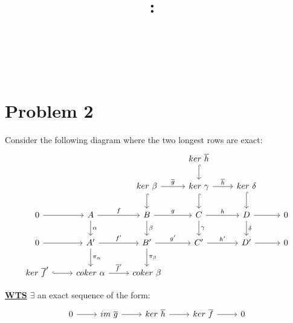 \documentclass{article}
\title{
    \vspace{2in}
    \textmd{\textbf{\hmwkClass:\ \hmwkTitle}}\\
    \vspace{0.1in}
    \textmd{\hmwkDueDate} \\
    \vspace{0.2in}\large{\textit{\hmwkClassInstructor\  }}
    \vspace{2in}
}
\author{\hmwkAuthorName}
\date{}
\begin{document}
\maketitle
\newpage

\section*{Problem 2}

Consider the following diagram where the two longest rows are exact: 
\[
\begin{tikzcd}
                                   &                                          &                                                      & ker \ \overline h \arrow[d, hook]                     &                                 &   \\
                                   &                                          & ker \ \beta \arrow[r, "\overline g"] \arrow[d, hook] & ker \ \gamma \arrow[d, hook] \arrow[r, "\overline h"] & ker \ \delta \arrow[d, hook]    &   \\
0 \arrow[r]                        & A \arrow[r, "f"] \arrow[d, "\alpha"]     & B \arrow[r, "g"] \arrow[d, "\beta"]                  & C \arrow[r, "h"] \arrow[d, "\gamma"]                  & D \arrow[r] \arrow[d, "\delta"] & 0 \\
0 \arrow[r]                        & A' \arrow[r, "f'"] \arrow[d, "\pi_{\alpha}"]             & B' \arrow[r, "g'"] \arrow[d, "\pi_{\beta}"]                         & C' \arrow[r, "h'"]                                    & D' \arrow[r]                    & 0 \\
ker \ \overline f' \arrow[r, hook] & coker \ \alpha \arrow[r, "\overline f'"] & coker \ \beta                                        &                                                       &                                 &  
\end{tikzcd}
\]

\vspace{0.1in}
\textbf{\underline{WTS}} $\exists$ an exact sequence of the form:
\[
  \begin{tikzcd}
0 \arrow[r] & im \ \overline g \arrow[r] & ker \ \overline h \arrow[r] & ker \ \overline f \arrow[r] & 0
\end{tikzcd}
\]
\end{document}
